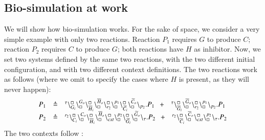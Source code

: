\subsection{Bio-simulation at work}

We will show how bio-simulation works. For the sake of space, we consider a  very simple
 example with only two reactions. 
Reaction $P_1$ requires $G$  to produce $C$; reaction $P_2$
requires $C$ to produce $G$; 
both reactions have $H$ as inhibitor.
Now, we set two systems defined by the same two reactions, with the two different initial configuration, and with two different context definitions.
The two reactions work as follows (where we omit to specify the cases where $H$ is present, as they will never happen):
\[
\begin{array}{lcl}
P_1 & \defeq &\startchain{\silent}\chainedlink{G_i}{\noact}\chainedlink{\noact}{G_o}
                                                  \chainedlink{\overline{H}_i}{\noact}\chainedlink{\noact}{\overline{H}_o}
					        \chainedlink{r_{2}}{\noact}\chainedlink{\noact}{p_1}
					        \chainedlink{\widetilde{C}_i}{\noact}\chainedlink{\noact}{\widetilde{C}_o}
			\chainend{p_{2}}.P_1  \   \
			 +\ 
					\ \  \startchain{\silent}\chainedlink{\overline{G}_i}{\noact}\chainedlink{\noact}{\overline{G}_o}\chainedlink{r_{2}}{\noact}\chainedlink{\noact}{p_1} \chainend{p_{2}}.P_1\\
					P_2 & \defeq &\startchain{r_2}\chainedlink{C_i}{\noact}\chainedlink{\noact}{C_o}
                                                  \chainedlink{\overline{H}_i}{\noact}\chainedlink{\noact}{\overline{H}_o}
					        \chainedlink{\mathit{cxt}}{\noact}\chainedlink{\noact}{p_2}
					        \chainedlink{\widetilde{G}_i}{\noact}\chainedlink{\noact}{\widetilde{G}_o}
			\chainend{\silent}.P_2  \   \
			 +\ 
					\ \  \startchain{r_2}\chainedlink{\overline{C}_i}{\noact}\chainedlink{\noact}{\overline{C}_o}\chainedlink{\mathit{cxt}}{\noact}\chainedlink{\noact}{p_2} \chainend{\silent}.P_2
			\end{array}
\]
The two contexts follow :\\
